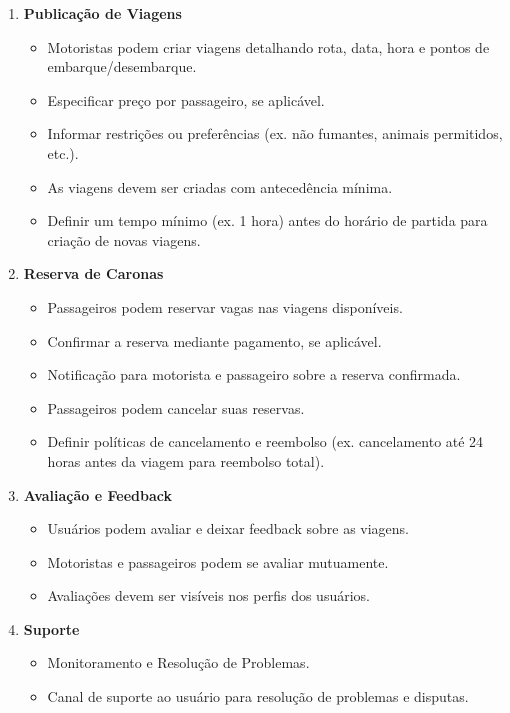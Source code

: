 \begin{enumerate}
	\item \textbf{Publicação de Viagens}
	
	\begin{itemize}
		\item Motoristas podem criar viagens detalhando rota, data, hora e pontos de embarque/desembarque.
		\item Especificar preço por passageiro, se aplicável.
		\item Informar restrições ou preferências (ex. não fumantes, animais permitidos, etc.).
		\item As viagens devem ser criadas com antecedência mínima.
		\item Definir um tempo mínimo (ex. 1 hora) antes do horário de partida para criação de novas viagens.
	\end{itemize}
	
	\item \textbf{Reserva de Caronas}
	
	\begin{itemize}
		\item Passageiros podem reservar vagas nas viagens disponíveis.
		\item Confirmar a reserva mediante pagamento, se aplicável.
		\item Notificação para motorista e passageiro sobre a reserva confirmada.
		\item Passageiros podem cancelar suas reservas.
		\item Definir políticas de cancelamento e reembolso (ex. cancelamento até 24 horas antes da viagem para reembolso total).
	\end{itemize}
	
	\item \textbf{Avaliação e Feedback}
	
	\begin{itemize}
		\item Usuários podem avaliar e deixar feedback sobre as viagens.
		\item Motoristas e passageiros podem se avaliar mutuamente.
		\item Avaliações devem ser visíveis nos perfis dos usuários.
	\end{itemize}
	
	\item \textbf{Suporte}
	
	\begin{itemize}
		\item Monitoramento e Resolução de Problemas.
		\item Canal de suporte ao usuário para resolução de problemas e disputas.
	\end{itemize}

\end{enumerate}

